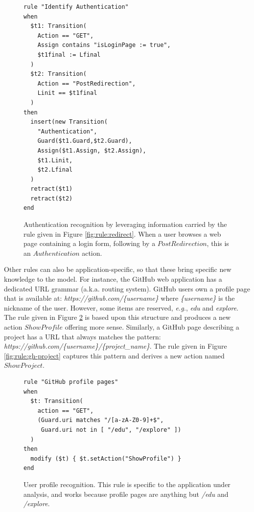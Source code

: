 \begin{figure}[h]
\begin{framed}
\begin{BVerbatim}
rule "Identify Authentication"
when
  $t1: Transition(
    Action == "GET",
    Assign contains "isLoginPage := true",
    $t1final := Lfinal
  )
  $t2: Transition(
    Action == "PostRedirection",
    Linit == $t1final
  )
then
  insert(new Transition(
    "Authentication",
    Guard($t1.Guard,$t2.Guard),
    Assign($t1.Assign, $t2.Assign),
    $t1.Linit,
    $t2.Lfinal
  )
  retract($t1)
  retract($t2)
end
\end{BVerbatim}
\end{framed}

    \caption{Authentication recognition by leveraging information
    carried by the rule given in Figure \ref{fig:rule:redirect}.
    When a user browses a web page containing a login form,
    following by a $PostRedirection$, this is an $Authentication$
    action.}
    \label{fig:rule:auth}
\end{figure}

Other rules can also be application-specific, so that these bring
specific new knowledge to the model. For instance, the GitHub web
application has a dedicated URL grammar (a.k.a. routing system).
GitHub users own a profile page that is available at:
\textit{https://github.com/\{username\}} where \textit{\{username\}}
is the nickname of the user. However, some items are reserved,
\emph{e.g.}, \textit{edu} and \textit{explore}. The rule given in Figure
\ref{fig:rule:gh-profile} is based upon this structure and
produces a new action $ShowProfile$ offering more sense.
Similarly, a GitHub page describing a project has a URL that
always matches the pattern:
\textit{https://github.com/\{username\}/\{project\_name\}}. The
rule given in Figure \ref{fig:rule:gh-project} captures this
pattern and derives a new action named $ShowProject$.

\begin{figure}[h]
\begin{framed}
\begin{BVerbatim}
rule "GitHub profile pages"
when
  $t: Transition(
    action == "GET",
    (Guard.uri matches "/[a-zA-Z0-9]+$",
     Guard.uri not in [ "/edu", "/explore" ])
  )
then
  modify ($t) { $t.setAction("ShowProfile") }
end
\end{BVerbatim}
\end{framed}

    \caption{User profile recognition. This rule is specific to the
    application under analysis, and works because profile pages are
    anything but \textit{/edu} and \textit{/explore}.}
    \label{fig:rule:gh-profile}
\end{figure}

